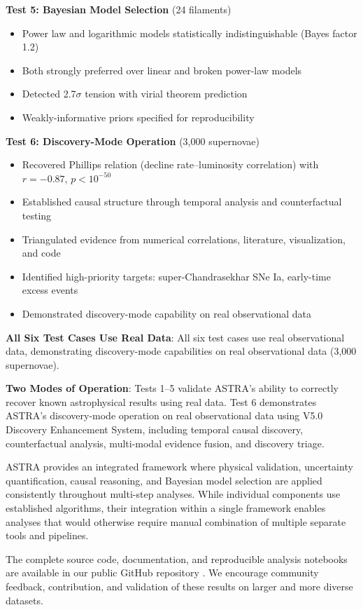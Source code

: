 \documentclass[usenatbib]{rasti}
\begin{document}
\textbf{Test 5: Bayesian Model Selection} (24 filaments)
\begin{itemize}
\item Power law and logarithmic models statistically indistinguishable (Bayes factor 1.2)
\item Both strongly preferred over linear and broken power-law models
\item Detected 2.7$\sigma$ tension with virial theorem prediction
\item Weakly-informative priors specified for reproducibility
\end{itemize}

\textbf{Test 6: Discovery-Mode Operation} (3,000 supernovae)
\begin{itemize}
\item Recovered Phillips relation (decline rate--luminosity correlation) with $r = -0.87$, $p < 10^{-50}$
\item Established causal structure through temporal analysis and counterfactual testing
\item Triangulated evidence from numerical correlations, literature, visualization, and code
\item Identified high-priority targets: super-Chandrasekhar SNe Ia, early-time excess events
\item Demonstrated discovery-mode capability on real observational data
\end{itemize}

\textbf{All Six Test Cases Use Real Data}: All six test cases use real observational data, demonstrating discovery-mode capabilities on real observational data (3,000 supernovae).

\textbf{Two Modes of Operation}: Tests 1--5 validate ASTRA's ability to correctly recover known astrophysical results using real data. Test 6 demonstrates ASTRA's discovery-mode operation on real observational data using V5.0 Discovery Enhancement System, including temporal causal discovery, counterfactual analysis, multi-modal evidence fusion, and discovery triage.

ASTRA provides an integrated framework where physical validation, uncertainty quantification, causal reasoning, and Bayesian model selection are applied consistently throughout multi-step analyses. While individual components use established algorithms, their integration within a single framework enables analyses that would otherwise require manual combination of multiple separate tools and pipelines.

The complete source code, documentation, and reproducible analysis notebooks are available in our public GitHub repository \cite{astra_github}. We encourage community feedback, contribution, and validation of these results on larger and more diverse datasets.
\end{document}
